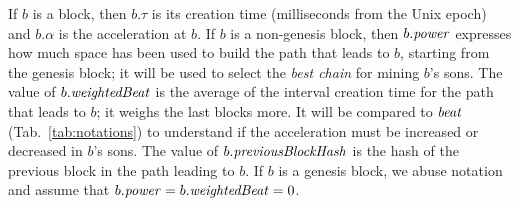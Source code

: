 %
If $b$ is a block, then $b.\tau$ is its creation time (milliseconds from the Unix epoch)
and $b.\alpha$ is the acceleration at $b$. If $b$ is a non-genesis block, then
$b.{\mathit{power}}$ expresses how much space has been used to build the path that leads to $b$,
starting from the genesis block; it will be used to select the \emph{best chain} for mining
$b$'s sons. The value of $b.\mathit{weightedBeat}$ is the average of the interval creation time
for the path that leads to $b$; it weighs the last blocks more. It will be
compared to ${\mathit{beat}}$ (Tab.~\ref{tab:notations}) to understand if the acceleration
must be increased or decreased in $b$'s sons.
The value of $b.{\mathit{previousBlockHash}}$ is the hash of the previous block in the path leading to $b$.
If $b$ is a genesis block, we abuse notation and assume that $b.{\mathit{power}}=b.\mathit{weightedBeat}=0$.

